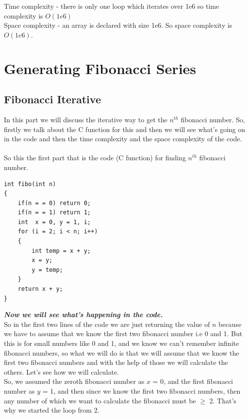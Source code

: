 \documentclass[12pt]{book}
\begin{document}
Time complexity - there is only one loop which iterates over 1e6 so time complexity is $O(1e6)$\\
Space complexity - an array is declared with size 1e6. So space complexity is $O(1e6)$.

\chapter{Generating Fibonacci Series}
\section{Fibonacci Iterative}
	In this part we will discuss the iterative way to get the $n^{th}$ fibonacci number. So, firstly we talk about the C function for this and then we will see what’s going on in the code and then the time complexity and the space complexity of the code.\\\\
	So this the first part that is the code (C function) for finding $n^{th}$ fibonacci number.\\
\begin{lstlisting}
int fibo(int n)
{
    if(n = = 0) return 0;
    if(n = = 1) return 1;
    int  x = 0, y = 1, i;
    for (i = 2; i < n; i++)
    {
        int temp = x + y;
        x = y;
        y = temp;
    }
    return x + y;
}
\end{lstlisting}

\textbf{\textit{Now we will see what’s happening in the code.}}\\
So in the first two lines of the code we are just returning the value of $n$ because we have to assume that we know the first two fibonacci number i.e 0 and 1. But this is for small numbers like 0 and 1, and we know we can’t remember infinite fibonacci numbers, so what we will do is that we will assume that we know the first two fibonacci numbers and with the help of those we will calculate the others. Let’s see how we will calculate.\\
So, we assumed the zeroth fibonacci number as $x$ = 0, and the first fibonacci number as $y$ = 1, and then since we know the first two fibonacci numbers, then any number of which we want to calculate the fibonacci must be $\geq$ 2. That’s why we started the loop from 2.\\
\end{document}

